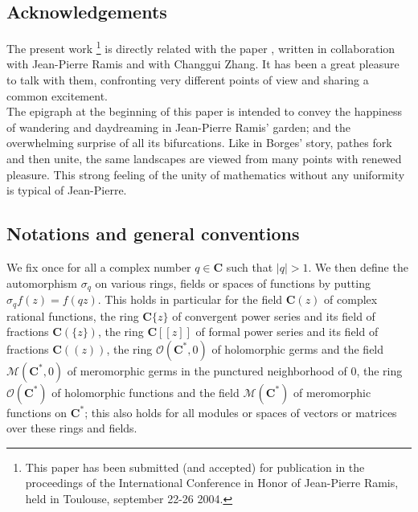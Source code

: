 \documentclass[english]{smfart}
\numberwithin{equation}{thm}
\def\sq{\sigma_q}
\def\C{{\mathbf C}}
\def\k{{\C(z)}}
\def\Ra{{\C\{z\}}}
\def\Ka{{\C(\{z\})}}
\def\Rf{{\C[[z]]}}
\def\Kf{{\C((z))}}
\def\Rw{{\mathcal{O}(\C^{*})}}
\def\Kw{{\mathcal{M}(\C^{*})}}
\def\Rwg{{\mathcal{O}(\C^{*},0)}}
\def\Kwg{{\mathcal{M}(\C^{*},0)}}
\begin{document}
\subsection*{Acknowledgements}

The present work 
\footnote{This paper has been submitted (and accepted) 
for publication in the proceedings of the International
Conference in Honor of Jean-Pierre Ramis, held in Toulouse,
september 22-26 2004.}
is directly related with the paper \cite{RSZ},
written in collaboration with Jean-Pierre Ramis and with Changgui
Zhang. It has been a great pleasure to talk with them, confronting
very different points of view and sharing a common excitement. \\

The epigraph at the beginning of this paper is intended to convey
the happiness of wandering and daydreaming in Jean-Pierre Ramis'
garden; and the overwhelming surprise of all its bifurcations.
Like in Borges' story, pathes fork and then unite, the same
landscapes are viewed from many points with renewed pleasure.
This strong feeling of the unity of mathematics without any
uniformity is typical of Jean-Pierre.



\subsection{Notations and general conventions}

We fix once for all a complex number $q \in \C$ such that $|q| > 1$. 
We then define the automorphism $\sq$ on various rings, fields or
spaces of functions by putting $\sq f(z) = f(qz)$. This holds 
in particular for the field $\k$ of complex rational functions,
the ring $\Ra$ of convergent power series and its field 
of fractions $\Ka$, the ring $\Rf$ of formal power series 
and its field of fractions $\Kf$, the ring $\Rwg$ of holomorphic 
germs and the field $\Kwg$ of meromorphic germs in the punctured 
neighborhood of $0$, the ring $\Rw$ of holomorphic functions
and the field $\Kw$ of meromorphic functions on $\C^{*}$; 
this also holds for all modules or spaces of vectors
or matrices over these rings and fields. \\
\end{document}
